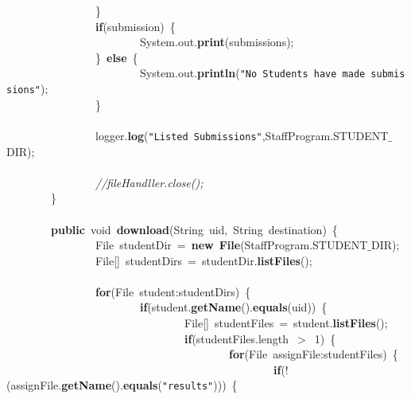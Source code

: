 \mbox{}\ \ \ \ \ \ \ \ \ \ \ \ \ \ \ \ \} \\
\mbox{}\ \ \ \ \ \ \ \ \ \ \ \ \ \ \ \ \textbf{if}(submission)\ \{ \\
\mbox{}\ \ \ \ \ \ \ \ \ \ \ \ \ \ \ \ \ \ \ \ \ \ \ \ System.out.\textbf{print}(submissions); \\
\mbox{}\ \ \ \ \ \ \ \ \ \ \ \ \ \ \ \ \}\ \textbf{else}\ \{ \\
\mbox{}\ \ \ \ \ \ \ \ \ \ \ \ \ \ \ \ \ \ \ \ \ \ \ \ System.out.\textbf{println}(\texttt{"{}No\ Students\ have\ made\ submissions"{}}); \\
\mbox{}\ \ \ \ \ \ \ \ \ \ \ \ \ \ \ \ \} \\
\mbox{} \\
\mbox{}\ \ \ \ \ \ \ \ \ \ \ \ \ \ \ \ logger.\textbf{log}(\texttt{"{}Listed\ Submissions"{}},StaffProgram.STUDENT$\_$DIR); \\
\mbox{} \\
\mbox{}\ \ \ \ \ \ \ \ \ \ \ \ \ \ \ \ \textit{//fileHandller.close();} \\
\mbox{}\ \ \ \ \ \ \ \ \} \\
\mbox{} \\
\mbox{}\ \ \ \ \ \ \ \ \textbf{public}\ void\ \textbf{download}(String\ uid,\ String\ destination)\ \{ \\
\mbox{}\ \ \ \ \ \ \ \ \ \ \ \ \ \ \ \ File\ studentDir\ =\ \textbf{new}\ \textbf{File}(StaffProgram.STUDENT$\_$DIR); \\
\mbox{}\ \ \ \ \ \ \ \ \ \ \ \ \ \ \ \ File[]\ studentDirs\ =\ studentDir.\textbf{listFiles}(); \\
\mbox{} \\
\mbox{}\ \ \ \ \ \ \ \ \ \ \ \ \ \ \ \ \textbf{for}(File\ student:studentDirs)\ \{ \\
\mbox{}\ \ \ \ \ \ \ \ \ \ \ \ \ \ \ \ \ \ \ \ \ \ \ \ \textbf{if}(student.\textbf{getName}().\textbf{equals}(uid))\ \{ \\
\mbox{}\ \ \ \ \ \ \ \ \ \ \ \ \ \ \ \ \ \ \ \ \ \ \ \ \ \ \ \ \ \ \ \ File[]\ studentFiles\ =\ student.\textbf{listFiles}(); \\
\mbox{}\ \ \ \ \ \ \ \ \ \ \ \ \ \ \ \ \ \ \ \ \ \ \ \ \ \ \ \ \ \ \ \ \textbf{if}(studentFiles.length\ $>$\ 1)\ \{ \\
\mbox{}\ \ \ \ \ \ \ \ \ \ \ \ \ \ \ \ \ \ \ \ \ \ \ \ \ \ \ \ \ \ \ \ \ \ \ \ \ \ \ \ \textbf{for}(File\ assignFile:studentFiles)\ \{ \\
\mbox{}\ \ \ \ \ \ \ \ \ \ \ \ \ \ \ \ \ \ \ \ \ \ \ \ \ \ \ \ \ \ \ \ \ \ \ \ \ \ \ \ \ \ \ \ \ \ \ \ \textbf{if}(!(assignFile.\textbf{getName}().\textbf{equals}(\texttt{"{}results"{}})))\ \{ \\
